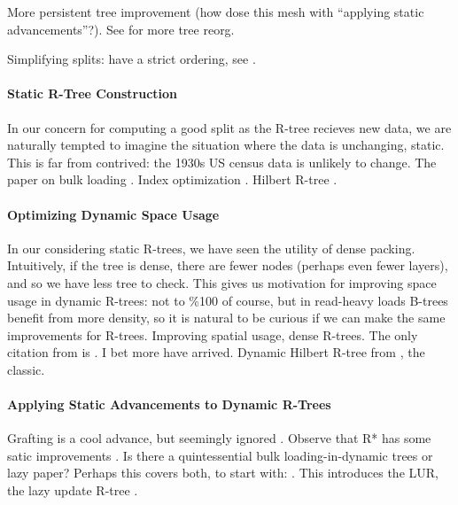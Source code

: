 More persistent tree improvement (how dose this mesh with ``applying static advancements''?).
See \cite{leehsujensencuiteo03} for more tree reorg.

Simplifying splits: have a strict ordering, see \cite{kamelfaloutsos94}.


\paragraph{Static R-Tree Construction}
In our concern for computing a good split as the R-tree recieves new data, we are naturally tempted to imagine the situation where the data is unchanging, static.
This is far from contrived: the 1930s US census data is unlikely to change.
The paper on bulk loading \cite{garcialopezleutenegger98a}.
Index optimization \cite{gavrila94}.
Hilbert R-tree \cite{kamelfaloutsos94}.

\paragraph{Optimizing Dynamic Space Usage}
In our considering static R-trees, we have seen the utility of dense packing.
Intuitively, if the tree is dense, there are fewer nodes (perhaps even fewer layers), and so we have less tree to check.
This gives us motivation for improving space usage in dynamic R-trees: not to \%100 of course, but in read-heavy loads B-trees benefit from more density, so it is natural to be curious if we can make the same improvements for R-trees.
Improving spatial usage, dense R-trees.
The only citation from \cite{thebook} is \cite{huanglinlin01}.
I bet more have arrived.
Dynamic Hilbert R-tree from \cite{kamelfaloutsos94}, the classic.

\paragraph{Applying Static Advancements to Dynamic R-Trees}
Grafting is a cool advance, but seemingly ignored \cite{schrekchen00}.
Observe that R* has some satic improvements \cite{beckmannkriegelschneiderseeger90}.
Is there a quintessential bulk loading-in-dynamic trees or lazy paper?
Perhaps this covers both, to start with: \cite{argehinrichsvahrenholdvitter99}.
This introduces the LUR, the lazy update R-tree \cite{kwonleelee02}.

